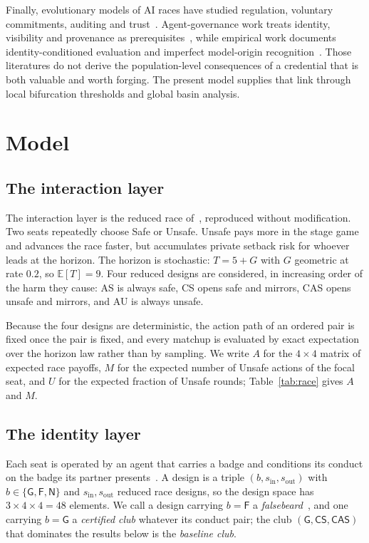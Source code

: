 \documentclass[a4paper,fleqn,longmktitle]{cas-sc}
\theoremstyle{plain}
\theoremstyle{definition}
\newcommand{\AS}{\textsf{AS}}
\newcommand{\CS}{\textsf{CS}}
\newcommand{\CAS}{\textsf{CAS}}
\newcommand{\AU}{\textsf{AU}}
\begin{document}
Finally, evolutionary models of AI races have studied regulation, voluntary
commitments, auditing and trust~\citep{han2020regulate,han2022voluntary,bova2024vigilant}.
Agent-governance work treats identity, visibility and provenance as
prerequisites~\citep{chan2024visibility,chan2025infrastructure,otsuka2026aiidentity},
while empirical work documents identity-conditioned evaluation and imperfect
model-origin recognition~\citep{panickssery2024llm,sun2025idiosyncrasies,wang2026outgroup}.
Those literatures do not derive the population-level consequences of a
credential that is both valuable and worth forging. The present model supplies
that link through local bifurcation thresholds and global basin analysis.
\section{Model}
\label{sec:model}

\subsection{The interaction layer}
\label{sec:race}

The interaction layer is the reduced race of~\citet{domingos2026falling},
reproduced without modification. Two seats repeatedly choose Safe or Unsafe.
Unsafe pays more in the stage game and advances the race faster, but accumulates
private setback risk for whoever leads at the horizon. The horizon is
stochastic: $T = 5 + G$ with $G$ geometric at rate $0.2$, so $\mathbb{E}[T] = 9$.
Four reduced designs are considered, in increasing order of the harm they cause:
\AS{} is always safe, \CS{} opens safe and mirrors, \CAS{} opens unsafe and
mirrors, and \AU{} is always unsafe.

Because the four designs are deterministic, the action path of an ordered pair
is fixed once the pair is fixed, and every matchup is evaluated by exact
expectation over the horizon law rather than by sampling. We write $A$ for the
$4 \times 4$
matrix of expected race payoffs, $M$ for the expected number of Unsafe actions
of the focal seat, and $U$ for the expected fraction of Unsafe rounds;
Table~\ref{tab:race} gives $A$ and $M$.

\subsection{The identity layer}
\label{sec:identity}

Each seat is operated by an agent that carries a badge and conditions its
conduct on the badge its partner
presents~\citep{long2025mirror,wang2026outgroup}. A design is a triple
$(b, s_{\mathrm{in}}, s_{\mathrm{out}})$ with $b \in \{\mathsf{G}, \mathsf{F},
\mathsf{N}\}$ and $s_{\mathrm{in}}, s_{\mathrm{out}}$ reduced race designs, so
the design space has $3 \times 4 \times 4 = 48$ elements. We call a design
carrying $b = \mathsf{F}$ a \emph{falsebeard}~\citep{gardner2010greenbeards},
and one carrying $b = \mathsf{G}$ a \emph{certified club} whatever its conduct
pair; the club $(\mathsf{G}, \CS, \CAS)$ that dominates the results below is
the \emph{baseline club}.
\end{document}
